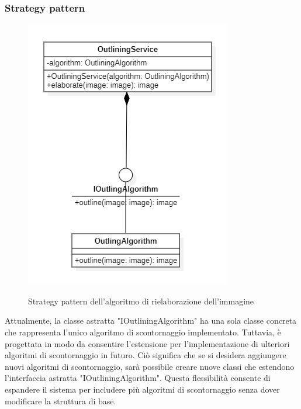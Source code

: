 \subsubsection{Strategy pattern}

\begin{figure}[H]
    \centering
    \includegraphics[scale = 1.0]{img/outlineStrategy.png}\\
    \caption{Strategy pattern dell'algoritmo di rielaborazione dell'immagine}
\end{figure}

Attualmente, la classe astratta "IOutliningAlgorithm" ha una sola classe concreta che rappresenta l'unico algoritmo 
di scontornaggio implementato. Tuttavia, è progettata in modo da consentire l'estensione per l'implementazione di ulteriori 
algoritmi di scontornaggio in futuro. Ciò significa che se si desidera aggiungere nuovi algoritmi di scontornaggio, 
sarà possibile creare nuove classi che estendono l'interfaccia astratta "IOutliningAlgorithm". 
Questa flessibilità consente di espandere il sistema per includere più algoritmi di scontornaggio senza dover 
modificare la struttura di base.

